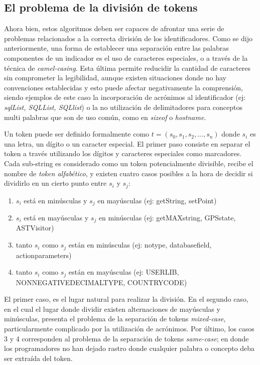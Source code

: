 \subsection{El problema de la división de tokens}
Ahora bien, estos algoritmos deben ser capaces de afrontar una serie de problemas relacionados a la correcta división de los identificadores. Como se dijo anteriormente, una forma de establecer una separación entre las palabras componentes de un indicador es el uso de caracteres especiales, o a través de la técnica de \textit{camel-casing}. Esta última permite reducidir la cantidad de caracteres sin comprometer la legibilidad, aunque existen situaciones donde no hay convenciones establecidas y esto puede afectar negativamente la comprensión, siendo ejemplos de este caso la incorporación de acrónimos al identificador (ej: \textit{sqlList, SQLList, SQLlist}) o la no utilización de delimitadores para conceptos multi palabras que son de uso común, como en \textit{sizeof} o \textit{hostname}.

Un token puede ser definido formalmente como $t = (s_0, s_1, s_2, ..., s_n)$ donde $s_i$ es una letra, un dígito o un caracter especial. El primer paso consiste en separar el token a través utilizando los dígitos y caracteres especiales como marcadores. Cada sub-string es considerado como un token potencialmente divisible, recibe el nombre de \textit{token alfabético}, y existen cuatro casos posibles a la hora de decidir si dividirlo en un cierto punto entre $s_i$ y $s_j$\cite{EnslenHillPollock09}:

\begin{enumerate}
  \item $s_i$ está en minúsculas y $s_j$ en mayúsculas (ej: getString, setPoint)
  \item $s_i$ está en mayúsculas y $s_j$ en minúsculas (ej: getMAXstring, GPSstate, ASTVisitor)
  \item tanto $s_i$ como $s_j$ están en minúsculas (ej: notype, databasefield, actionparameters)
  \item tanto $s_i$ como $s_j$ están en mayúsculas (ej: USERLIB, NONNEGATIVEDECIMALTYPE, COUNTRYCODE)
\end{enumerate}

El primer caso, es el lugar natural para realizar la división. En el segundo caso, en el cual el lugar donde dividir existen alternaciones de mayúsculas y minúsculas, presenta el problema de la separación de tokens \textit{mixed-case}, particularmente complicado por la utilización de acrónimos. Por último, los casos 3 y 4 corresponden al problema de la separación de tokens \textit{same-case}; en donde los programadores no han dejado rastro donde cualquier palabra o concepto deba ser extraída del token.

